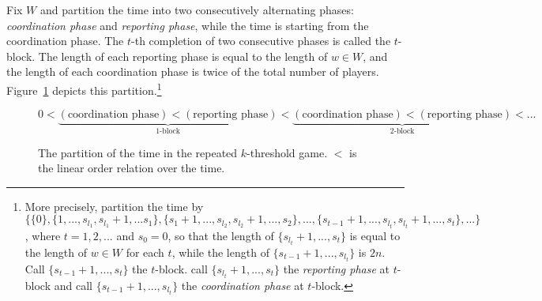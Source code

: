 \documentclass[12pt,letter]{article}
\theoremstyle{definition}
\theoremstyle{remark}
\theoremstyle{claim}
\begin{document}
Fix $W$ and partition the time into two consecutively alternating phases: \textit{coordination phase} and \textit{reporting phase}, while the time is starting from the coordination phase. The $t$-th completion of two consecutive phases is called the $t$-block. The length of each reporting phase is equal to the length of $w\in W$, and the length of each coordination phase is twice of the total number of players. Figure~\ref{fig:ordered_original_game_intro} depicts this partition.\footnote{More precisely, partition the time by $\{\{0\},\{1,...,s_{l_1},s_{l_1}+1,...s_1\},\{s_1+1,...,s_{l_2},s_{l_2}+1,...,s_2\},...,\{s_{t-1}+1,...,s_{l_{t}},s_{l_t}+1,...,s_t\},...\}$, where $t=1,2,...$ and $s_{0}=0$, so that the length of $\{s_{l_t}+1,...,s_t\}$ is equal to the length of $w\in W$ for each $t$, while the length of $\{s_{t-1}+1,...,s_{l_t}\}$ is $2n$. Call $\{s_{t-1}+1,...,s_t\}$ the $t$-block. call $\{s_{l_t}+1,...,s_t\}$ the \textit{reporting phase} at $t$-block and call $\{s_{t-1}+1,...,s_{l_t}\}$ the \textit{coordination phase} at $t$-block.}

\begin{figure}
\[0<\underbrace{(\text{coordination phase})<(\text{reporting phase})}_{\text{$1$-block}}<\underbrace{(\text{coordination phase})<(\text{reporting phase})}_{\text{$2$-block}}<...\]
\caption{The partition of the time in the repeated $k$-threshold game. $<$ is the linear order relation over the time.}
\label{fig:ordered_original_game_intro}
\end{figure}
\end{document}
